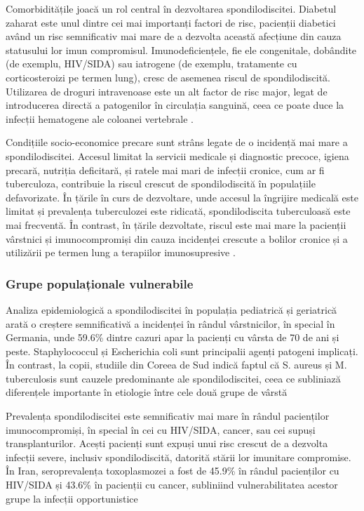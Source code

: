 \message{ !name(LaMain.tex)}\documentclass[romanian,12pt,a4paper]{article}
\begin{document}
Comorbiditățile joacă un rol central în dezvoltarea spondilodiscitei.
Diabetul zaharat este unul dintre cei mai importanți factori de risc,
pacienții diabetici având un risc semnificativ mai mare de a dezvolta
această afecțiune din cauza statusului lor imun compromisul.
Imunodeficiențele, fie ele congenitale, dobândite (de exemplu, HIV/SIDA)
sau iatrogene (de exemplu, tratamente cu corticosteroizi pe termen
lung), cresc de asemenea riscul de spondilodiscită. Utilizarea de
droguri intravenoase este un alt factor de risc major, legat de
introducerea directă a patogenilor în circulația sanguină, ceea ce poate
duce la infecții hematogene ale coloanei vertebrale
\cite{RadionuclideImagingMusculoskeletal2016}\cite{ImagingAssessmentSpine2024}.

Condițiile socio-economice precare sunt strâns legate de o incidență mai
mare a spondilodiscitei. Accesul limitat la servicii medicale și
diagnostic precoce, igiena precară, nutriția deficitară, și ratele mai
mari de infecții cronice, cum ar fi tuberculoza, contribuie la riscul
crescut de spondilodiscită în populațiile defavorizate. În țările în
curs de dezvoltare, unde accesul la îngrijire medicală este limitat și
prevalența tuberculozei este ridicată, spondilodiscita tuberculoasă este
mai frecventă. În contrast, în țările dezvoltate, riscul este mai mare
la pacienții vârstnici și imunocompromiși din cauza incidenței crescute
a bolilor cronice și a utilizării pe termen lung a terapiilor
imunosupresive \cite{RoleNuclearMedicine2012}.

\subsubsection{Grupe populaționale vulnerabile}

Analiza epidemiologică a spondilodiscitei în populația pediatrică și
geriatrică arată o creștere semnificativă a incidenței în rândul
vârstnicilor, în special în Germania, unde 59.6\% dintre cazuri apar la
pacienți cu vârsta de 70 de ani și peste. Staphylococcul și Escherichia
coli sunt principalii agenți patogeni implicați. În contrast, la copii,
studiile din Coreea de Sud indică faptul că S. aureus și M. tuberculosis
sunt cauzele predominante ale spondilodiscitei, ceea ce subliniază
diferențele importante în etiologie între cele două grupe de vârstă
\cite{EtiologyClinicalPresentation2016}

Prevalența spondilodiscitei este semnificativ mai mare în rândul
pacienților imunocompromiși, în special în cei cu HIV/SIDA, cancer, sau
cei supuși transplanturilor. Acești pacienți sunt expuși unui risc
crescut de a dezvolta infecții severe, inclusiv spondilodiscită,
datorită stării lor imunitare compromise. În Iran, seroprevalența
toxoplasmozei a fost de 45.9\% în rândul pacienților cu HIV/SIDA și
43.6\% în pacienții cu cancer, subliniind vulnerabilitatea acestor grupe
la infecții opportunistice \cite{EpidemiologySpondylodiscitisGermany2023}
\pagebreak
\end{document}
